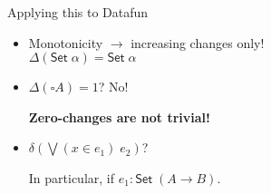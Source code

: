 \documentclass{beamer}
\newcommand{\ms}{\mathsf}
\begin{document}
\begin{frame}{Applying this to Datafun}
  \large
  \begin{itemize}
  \item Monotonicity $\to$ increasing changes only!\\
    $\Delta(\ms{Set}\; \alpha) = \ms{Set}\;\alpha$

    \vspace{0.2cm}

  \item $\Delta(\square A) = 1$? No!

    \textbf{Zero-changes are not trivial!}

    \vspace{0.2cm}

  \item $\delta (\bigvee(x \in e_1)\; e_2)$?

    In particular, if $e_1 : \ms{Set}\; (A \to B)$.

    \vspace{0.2cm}

  \end{itemize}
\end{frame}
\end{document}

